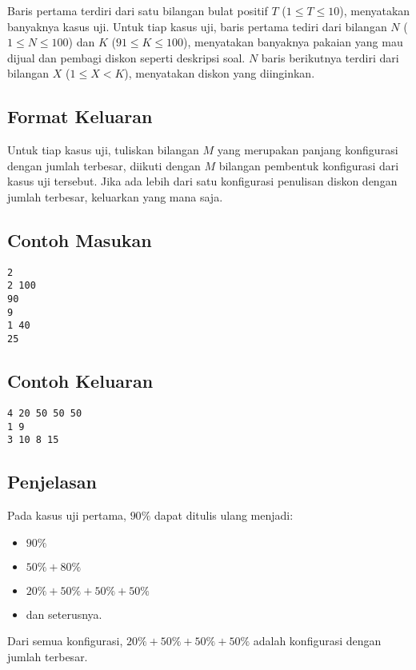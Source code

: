 \documentclass{article}
\begin{document}
Baris pertama terdiri dari satu bilangan bulat positif $T$ ($1 \leq T \leq 10$), menyatakan banyaknya kasus uji.
Untuk tiap kasus uji, baris pertama tediri dari bilangan $N$ ($1 \leq N \leq 100$) dan $K$ ($91 \leq K \leq 100$), menyatakan banyaknya pakaian yang mau dijual dan pembagi diskon seperti deskripsi soal.
$N$ baris berikutnya terdiri dari bilangan $X$ ($1 \leq X < K$), menyatakan diskon yang diinginkan.

\subsection*{Format Keluaran}

Untuk tiap kasus uji, tuliskan bilangan $M$ yang merupakan panjang konfigurasi dengan jumlah terbesar, diikuti dengan $M$ bilangan pembentuk konfigurasi dari kasus uji tersebut.
Jika ada lebih dari satu konfigurasi penulisan diskon dengan jumlah terbesar, keluarkan yang mana saja.
\\

\begin{multicols}{2}
\subsection*{Contoh Masukan}
\begin{lstlisting}
2
2 100
90
9
1 40
25
\end{lstlisting}
\columnbreak
\subsection*{Contoh Keluaran}
\begin{lstlisting}
4 20 50 50 50
1 9
3 10 8 15
\end{lstlisting}
\vfill
\null
\end{multicols}

\subsection*{Penjelasan}
Pada kasus uji pertama, $90\%$ dapat ditulis ulang menjadi:

\begin{itemize}
    \setlength\itemsep{0pt}
    \item $90\%$
    \item $50\% + 80\%$
    \item $20\% + 50\% + 50\% + 50\%$
    \item dan seterusnya.
\end{itemize}

Dari semua konfigurasi, $20\% + 50\% + 50\% + 50\%$ adalah konfigurasi dengan jumlah terbesar.

\pagebreak
\end{document}

